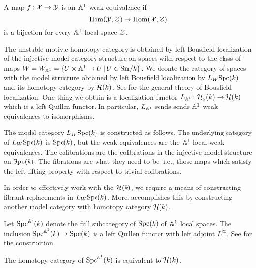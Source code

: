 \documentclass{amsart}%
\begin{document}
\begin{definition}
  A map $f: \mathcal{X} \to \mathcal{Y}$ is an $\mathbb{A}^1$ weak equivalence if 
  \begin{equation*}
    \operatorname{Hom}(\mathcal{Y}, \mathcal{Z}) \to \operatorname{Hom}(\mathcal{X}, \mathcal{Z})
  \end{equation*}
  is a bijection for every $\mathbb{A}^1$ local space $\mathcal{Z}$.
\end{definition}

The unstable motivic homotopy category is obtained by left Bousfield
localization of the injective model category structure on spaces with
respect to the class of maps
$W = W_{\mathbb{A}^1} = \{ U \times \mathbb{A}^1 \to U \, \vert \, U \in \mathrm{Sm}/k\}$. We
deonte the category of spaces with the model structure obtained by
left Bousfield localization by $L_W\mathrm{Spc}(k)$ and its homotopy category
by $\mathcal{H}(k)$. See %
\cite[Chapter 3]{Hhorn} for the general theory of Bousfield
localization. One thing we obtain is a localization functor
$L_{\mathbb{A}^1} : \mathcal{H}_s(k) \to \mathcal{H}(k)$ which is a left Quillen
functor.  In particular, $L_{\mathbb{A}^1}$ sends sends $\mathbb{A}^1$ weak
equivalences to isomorphisms.

The model category $L_W\mathrm{Spc}(k)$ is constructed as follows. The
underlying category of $L_W\mathrm{Spc}(k)$ is $\mathrm{Spc}(k)$, but the weak
equivalences are the $\mathbb{A}^1$-local weak equivalences. The
cofibrations are the cofibrations in the injective model structure on
$\mathrm{Spc}(k)$. The fibrations are what they need to be, i.e., those maps
which satisfy the left lifting property with respect to trivial
cofibrations.

In order to effectively work with the $\mathcal{H}(k)$, we require a means
of constructing fibrant replacements in $L_W\mathrm{Spc}(k)$. Morel
accomplishes this by constructing another model category with homotopy
category $\mathcal{H}(k)$. 

\begin{definition}
  Let $\mathrm{Spc}^{\mathbb{A}^1}(k)$ denote the full subcategory of $\mathrm{Spc}(k)$
  of $\mathbb{A}^1$ local spaces. The inclusion
  $\mathrm{Spc}^{\mathbb{A}^1}(k) \to \mathrm{Spc}(k)$ is a left Quillen functor with
  left adjoint $L^{\infty}$. See \cite[Proposition 3.2.3]{Mor05} for
  the construction. 
\end{definition}

\begin{proposition}
  The homotopy category of $\mathrm{Spc}^{\mathbb{A}^1}(k)$ is equivalent to
  $\mathcal{H}(k)$. 
\end{proposition}
\end{document}
